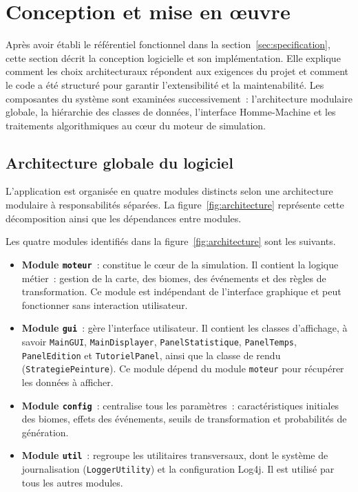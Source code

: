 \section{Conception et mise en œuvre}
\label{sec:realisation}

Après avoir établi le référentiel fonctionnel dans la
section~\ref{sec:specification}, cette section décrit la conception logicielle et
son implémentation. Elle explique comment les choix architecturaux répondent aux
exigences du projet et comment le code a été structuré pour garantir
l'extensibilité et la maintenabilité. Les composantes du système sont examinées
successivement~: l'architecture modulaire globale, la hiérarchie des classes de
données, l'interface Homme-Machine et les traitements algorithmiques au cœur du
moteur de simulation.

\subsection{Architecture globale du logiciel}
\label{subsec:archi_globale}

L'application est organisée en quatre modules distincts selon une architecture
modulaire à responsabilités séparées. La figure~\ref{fig:architecture} représente
cette décomposition ainsi que les dépendances entre modules.

Les quatre modules identifiés dans la figure~\ref{fig:architecture} sont les
suivants.

\begin{itemize}
  \item \textbf{Module \texttt{moteur}}~: constitue le cœur de la simulation. Il
    contient la logique métier~: gestion de la carte, des biomes, des événements
    et des règles de transformation. Ce module est indépendant de l'interface
    graphique et peut fonctionner sans interaction utilisateur.
  \item \textbf{Module \texttt{gui}}~: gère l'interface utilisateur. Il contient
    les classes d'affichage, à savoir \texttt{MainGUI}, \texttt{MainDisplayer},
    \texttt{PanelStatistique}, \texttt{PanelTemps}, \texttt{PanelEdition}
    et \texttt{TutorielPanel}, ainsi que la classe de rendu (\texttt{StrategiePeinture}).
    Ce module dépend du module \texttt{moteur} pour récupérer les données à
    afficher.
  \item \textbf{Module \texttt{config}}~: centralise tous les paramètres~:
    caractéristiques initiales des biomes, effets des événements, seuils de
    transformation et probabilités de génération.
  \item \textbf{Module \texttt{util}}~: regroupe les utilitaires transversaux,
    dont le système de journalisation (\texttt{LoggerUtility}) et la configuration
    Log4j. Il est utilisé par tous les autres modules.
\end{itemize}

